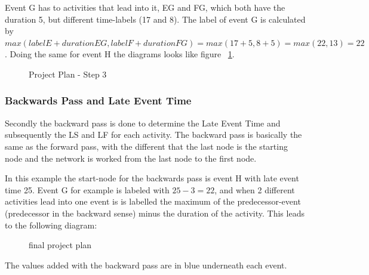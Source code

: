Event G has to activities that lead into it, EG and FG, which both have the duration 5, but different time-labels (17 and 8). The label of event G is calculated by $ max(label E + duration EG, label F + duration FG) = max(17+5, 8+5) = max(22,13) = 22 $. Doing the same for event H the diagrams looks like figure ~\ref{pic:plan5}.
\begin{figure}[h] 
\centerline{}
\label{pic:plan5}
\caption{Project Plan - Step 3}
\end{figure}
\subsubsection{Backwards Pass and Late Event Time}
 Secondly the backward pass is done to determine the Late Event Time and subsequently the LS and LF for each activity.
 The backward pass is basically the same as the forward pass, with the different that the last node is the starting node and the network is worked from the last node to the first node.

In this example the start-node for the backwards pass is event H with late event time 25. Event G for example is labeled with $ 25-3 = 22 $, and when 2 different activities lead into one event is is labelled the maximum of the predecessor-event (predecessor in the backward sense) minus the duration of the activity. This leads to the following diagram:
\begin{figure}[h] 
\centerline{}
\label{pic:plan6}
\caption{final project plan}
\end{figure}
The values added with the backward pass are in blue underneath each event.

